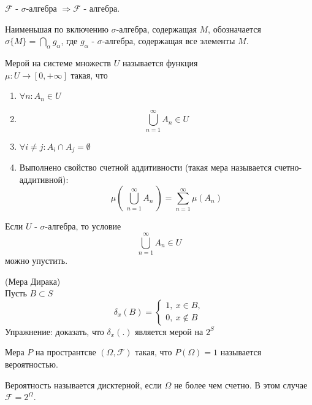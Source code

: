 \documentclass[a4paper, 12pt]{article}
\begin{document}
\begin{comm}
    $\mathcal{F}$ - $\sigma$-алгебра $\Rightarrow \mathcal{F}$ - алгебра.
\end{comm}
\begin{comm}
    Наименьшая по включению $\sigma$-алгебра, содержащая $M$, обозначается $\sigma\{M\}=\bigcap\limits_{\alpha}g_{\alpha}$, где $g_{\alpha}$ - $\sigma$-алгебра, содержащая все элементы $M$.
\end{comm}
\begin{definition}
    Мерой на системе множеств $U$ называется функция\\ 
    $\mu: U\to [0,+\infty]$ такая, что
    \begin{enumerate}
        \item $\forall n: A_n\in U$
        \item \[\bigcup\limits_{n=1}^{\infty}A_n\in U\]
        \item $\forall i\ne j: A_i\cap A_j=\emptyset$
        \item Выполнено свойство счетной аддитивности (такая мера называется счетно-аддитивной):
        \[\mu\left(\ \bigcup\limits_{n=1}^{\infty}A_n\ \right)=\sum_{n=1}^{\infty}\mu(A_n)\]
    \end{enumerate}
\end{definition}
\begin{comm}
    Если $U$ - $\sigma$-алгебра, то условие
    \[\bigcup\limits_{n=1}^{\infty}A_n\in U\]
    можно упустить.
\end{comm}
\begin{example} (Мера Дирака)\\
    Пусть $B\subset S$
    \[\delta_x(B)=\begin{cases}
        1,\ x\in B,\\
        0,\ x\not\in B
    \end{cases}\]
    Упражнение: доказать, что $\delta_x(.)$ является мерой на $2^S$
\end{example}
\begin{definition}
    Мера $P$ на пространтсве $(\Omega, \mathcal{F})$ такая, что $P(\Omega)=1$ называется вероятностью.
\end{definition}
\begin{definition}
    Вероятность называется дисктерной, если $\Omega$ не более чем счетно. В этом случае $\mathcal{F}=2^{\Omega}$.
\end{definition}
\end{document}
